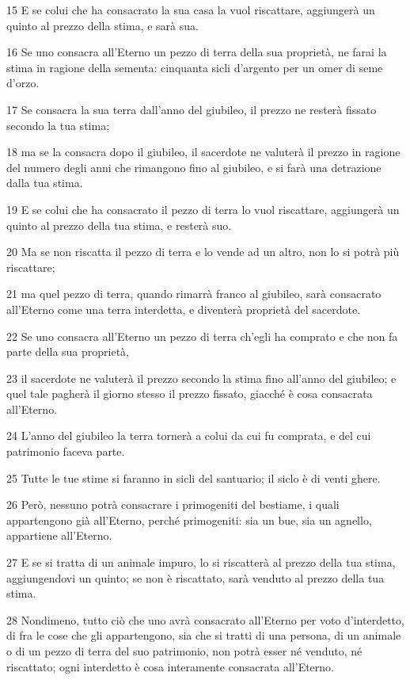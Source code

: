 \par 15 E se colui che ha consacrato la sua casa la vuol riscattare, aggiungerà un quinto al prezzo della stima, e sarà sua.
\par 16 Se uno consacra all'Eterno un pezzo di terra della sua proprietà, ne farai la stima in ragione della sementa: cinquanta sicli d'argento per un omer di seme d'orzo.
\par 17 Se consacra la sua terra dall'anno del giubileo, il prezzo ne resterà fissato secondo la tua stima;
\par 18 ma se la consacra dopo il giubileo, il sacerdote ne valuterà il prezzo in ragione del numero degli anni che rimangono fino al giubileo, e si farà una detrazione dalla tua stima.
\par 19 E se colui che ha consacrato il pezzo di terra lo vuol riscattare, aggiungerà un quinto al prezzo della tua stima, e resterà suo.
\par 20 Ma se non riscatta il pezzo di terra e lo vende ad un altro, non lo si potrà più riscattare;
\par 21 ma quel pezzo di terra, quando rimarrà franco al giubileo, sarà consacrato all'Eterno come una terra interdetta, e diventerà proprietà del sacerdote.
\par 22 Se uno consacra all'Eterno un pezzo di terra ch'egli ha comprato e che non fa parte della sua proprietà,
\par 23 il sacerdote ne valuterà il prezzo secondo la stima fino all'anno del giubileo; e quel tale pagherà il giorno stesso il prezzo fissato, giacché è cosa consacrata all'Eterno.
\par 24 L'anno del giubileo la terra tornerà a colui da cui fu comprata, e del cui patrimonio faceva parte.
\par 25 Tutte le tue stime si faranno in sicli del santuario; il siclo è di venti ghere.
\par 26 Però, nessuno potrà consacrare i primogeniti del bestiame, i quali appartengono già all'Eterno, perché primogeniti: sia un bue, sia un agnello, appartiene all'Eterno.
\par 27 E se si tratta di un animale impuro, lo si riscatterà al prezzo della tua stima, aggiungendovi un quinto; se non è riscattato, sarà venduto al prezzo della tua stima.
\par 28 Nondimeno, tutto ciò che uno avrà consacrato all'Eterno per voto d'interdetto, di fra le cose che gli appartengono, sia che si tratti di una persona, di un animale o di un pezzo di terra del suo patrimonio, non potrà esser né venduto, né riscattato; ogni interdetto è cosa interamente consacrata all'Eterno.
